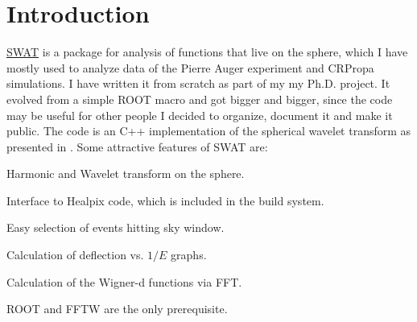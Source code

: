 \documentclass[12pt]{article}
\begin{document}
  \vfill


\newpage
\tableofcontents

\section{Introduction} \label{ch::Introduction}

\href{http://www.ifi.unicamp.br/~mzimbres}{SWAT} is a package for analysis of
functions that live on the sphere, which I have mostly used to analyze data of
the Pierre Auger experiment and CRPropa simulations. I have written it from
scratch as part of my my Ph.D. project. It evolved from a simple ROOT macro and
got bigger and bigger, since the code may be useful for other people I decided
to organize, document it and make it public. The code is an C++ implementation
of the spherical wavelet transform as presented in \cite{wiaux}. Some
attractive features of SWAT are:

\begin{list}{}{}
\item Harmonic and Wavelet transform on the sphere.
\item Interface to Healpix code, which is included in the build system.
\item Easy selection of events hitting sky window.
\item Calculation of deflection vs. $1/E$ graphs.
\item Calculation of the Wigner-d functions via FFT.
\item ROOT and FFTW are the only prerequisite.
\end{list}
\end{document}

